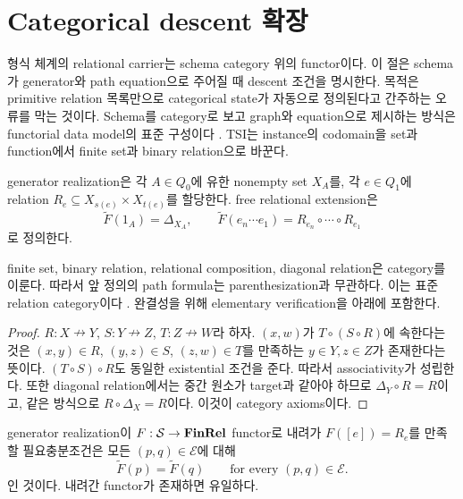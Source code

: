 \section{Categorical descent 확장}

형식 체계의 relational carrier는 schema category 위의 functor이다. 이 절은
schema가 generator와 path equation으로 주어질 때 descent 조건을 명시한다.
목적은 primitive relation 목록만으로 categorical state가 자동으로 정의된다고
간주하는 오류를 막는 것이다. Schema를 category로 보고 graph와 equation으로
제시하는 방식은 functorial data model의 표준 구성이다
\cite{spivak2012functorial,spivakwisnesky2015relational}. TSI는 instance의
codomain을 set과 function에서 finite set과 binary relation으로 바꾼다.


\begin{definition}
generator realization은 각 $A\in Q_0$에 유한 nonempty set $X_A$를, 각
$e\in Q_1$에 relation
$R_e\subseteq X_{s(e)}\times X_{t(e)}$를 할당한다. free relational
extension은
\[
 \widetilde F(1_A)=\Delta_{X_A},\qquad
 \widetilde F(e_n\cdots e_1)
 =R_{e_n}\circ\cdots\circ R_{e_1}
\]
로 정의한다.
\end{definition}

\begin{proposition}
finite set, binary relation, relational composition, diagonal relation은
category를 이룬다. 따라서 앞 정의의 path formula는 parenthesization과
무관하다. 이는 표준 relation category이다
\cite{freydscedrov1990categories}. 완결성을 위해 elementary verification을
아래에 포함한다.
\end{proposition}

\begin{proof}
$R:X\nrightarrow Y$, $S:Y\nrightarrow Z$, $T:Z\nrightarrow W$라 하자.
$(x,w)$가 $T\circ(S\circ R)$에 속한다는 것은
$(x,y)\in R$, $(y,z)\in S$, $(z,w)\in T$를 만족하는
$y\in Y,z\in Z$가 존재한다는 뜻이다. $(T\circ S)\circ R$도
동일한 existential 조건을 준다. 따라서 associativity가 성립한다.
또한 diagonal relation에서는 중간 원소가 target과 같아야 하므로
$\Delta_Y\circ R=R$이고, 같은 방식으로
$R\circ\Delta_X=R$이다. 이것이 category axioms이다.
\end{proof}

\begin{theorem}
generator realization이
$F:\mathcal S\to\mathbf{FinRel}$ functor로 내려가
$F([e])=R_e$를 만족할 필요충분조건은 모든 $(p,q)\in\mathcal E$에 대해
\[
 \widetilde F(p)=\widetilde F(q)
 \qquad\text{for every }(p,q)\in\mathcal E.
\]
인 것이다. 내려간 functor가 존재하면 유일하다.
\end{theorem}

